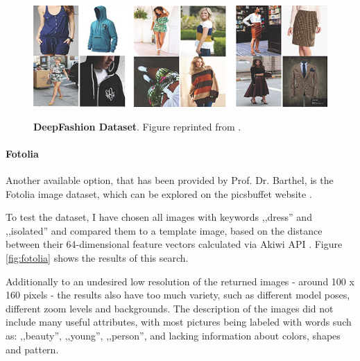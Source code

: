 \documentclass[12pt]{report}
\begin{document}
\begin{figure}[h]
\centering
{\includegraphics[width=\linewidth]{03_analysis/data/deepfashion}}
\caption{\label{fig:deepfashion} \textbf{DeepFashion Dataset}. Figure reprinted from \cite{liu2016deepfashion}.}
\end{figure}

\paragraph{Fotolia}
Another available option, that has been provided by Prof. Dr. Barthel, is the Fotolia image dataset, which can be explored on the picsbuffet website \cite{noauthor_picsbuffet_nodate}. 

To test the dataset, I have chosen all images with keywords ,,dress'' and ,,isolated'' and compared them to a template image, based on the distance between their 64-dimensional feature vectors calculated via Akiwi API \cite{sonnenberg_akiwi_nodate}. Figure \ref{fig:fotolia} shows the results of this search. 

Additionally to an undesired low resolution of the returned images - around 100 x 160 pixels - the results also have too much variety, such as different model poses, different zoom levels and backgrounds. The description of the images did not include many useful attributes, with most pictures being labeled with words such as: ,,beauty'', ,,young'', ,,person'', and lacking information about colors, shapes and pattern.
\end{document}
